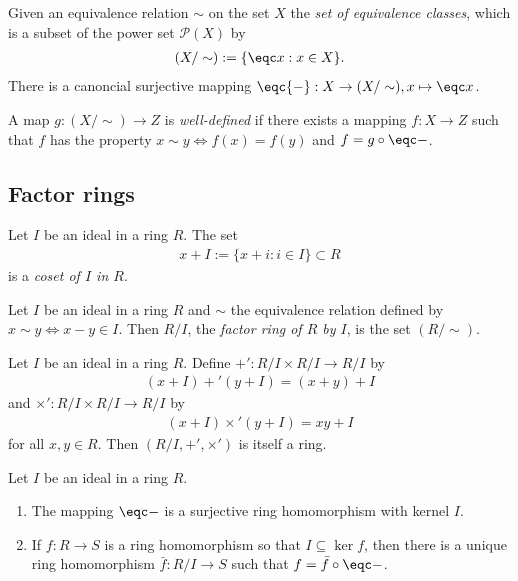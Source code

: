 \documentclass{article}
\begin{document}
\begin{definition}
	Given an equivalence relation $\sim$ on the set $X$ the \emph{set of equivalence classes},
	which is a subset of the power set $\mathcal{P}(X)$ by
	\begin{align*}
		(X/\sim) := \{\eqc x : x \in X\}.
	\end{align*}
	There is a canoncial surjective mapping $\eqc{-}:X\to (X/\sim),x\mapsto\eqc x$.
\end{definition}

\begin{definition}
	A map $g:(X/\sim)\to Z$ is \emph{well-defined} if there exists a mapping $f:X\to Z$
	such that $f$ has the property $x\sim y\Leftrightarrow f(x)=f(y)$ and $f=g\circ\eqc-$.
\end{definition}

\subsection{Factor rings}

\begin{definition}
	Let $I$ be an ideal in a ring $R$. The set
	\begin{align*}
		x + I := \{x + i : i\in I\}\subset R
	\end{align*}
	is a \emph{coset of $I$ in $R$}.
\end{definition}

\begin{definition}
	Let $I$ be an ideal in a ring $R$ and $\sim$ the equivalence relation defined by
	$x\sim y\Leftrightarrow x-y\in I$. Then $R/I$, the \emph{factor ring of $R$ by $I$},
	is the set $(R/\sim)$.
\end{definition}

\begin{theorem}[Notes 3.6.4]
	Let $I$ be an ideal in a ring $R$. Define $+':R/I\times R/I\to R/I$ by
	\begin{align*}
		(x+I)+'(y+I) = (x+y) + I
	\end{align*}
	and $\times' : R/I\times R/I\to R/I$ by
	\begin{align*}
		(x+I)\times' (y+I) = xy + I
	\end{align*}
	for all $x,y\in R$. Then $(R/I,+',\times')$ is itself a ring.
\end{theorem}

\begin{theorem}[Notes 3.6.7]
	Let $I$ be an ideal in a ring $R$.
	\begin{enumerate}
		\item The mapping $\eqc -$ is a surjective ring homomorphism with kernel $I$.
		\item If $f:R\to S$ is a ring homomorphism so that $I\subseteq\ker f$, then there
		      is a unique ring homomorphism $\bar f:R/I\to S$ such that $f=\bar f\circ\eqc -$.
	\end{enumerate}
\end{theorem}
\end{document}
